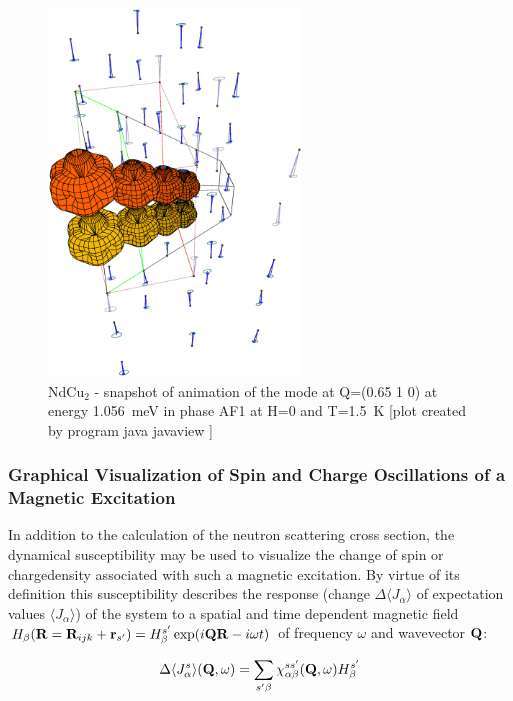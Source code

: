 \begin{figure}[ht]%
\begin{center}\leavevmode
\includegraphics[angle=-0, width=0.6\textwidth]{figsrc/animationAF1.eps}
\end{center}
\caption{\label{animationAF1}
NdCu$_2$ - snapshot of animation of the mode at Q=(0.65 1 0) at energy 1.056~meV in phase AF1 at 
H=0 and T=1.5~K [plot created by program {\prg java javaview }]
}
\end{figure}

\subsubsection{Graphical Visualization of Spin and Charge Oscillations of a Magnetic Excitation}

In addition to the calculation of the neutron scattering cross section, the dynamical susceptibility may be used to %
visualize the change of spin or chargedensity associated with such a magnetic excitation. By virtue of its definition %
this susceptibility describes the response (change $\Delta \langle J_{\alpha} \rangle$ of expectation values $\langle %
J_{\alpha}\rangle$) of the system to a spatial and time dependent magnetic field $H_{\beta}(\mbf R=\mbf R_{ijk}+\mbf %
r_{s'})=H^{s'}_{\beta}
\exp(i\mbf Q \mbf R-i\omega t)$ of frequency $\omega$ and wavevector $\mathbf Q$:

\begin{equation}
\Delta \langle J^s_{\alpha}\rangle(\mathbf Q,\omega)=\sum_{s'\beta}\chi^{ss'}_{\alpha\beta}(\mathbf Q,\omega) H^{s'}_{\beta}
\end{equation} 

